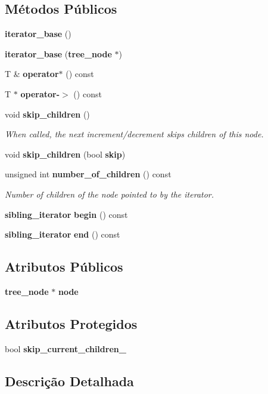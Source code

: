 \subsection*{Métodos Públicos}
\begin{DoxyCompactItemize}
\item 
{\bf iterator\+\_\+base} ()
\item 
{\bf iterator\+\_\+base} ({\bf tree\+\_\+node} $\ast$)
\item 
T \& {\bf operator$\ast$} () const 
\item 
T $\ast$ {\bf operator-\/$>$} () const 
\item 
void {\bf skip\+\_\+children} ()
\begin{DoxyCompactList}\small\item\em When called, the next increment/decrement skips children of this node. \end{DoxyCompactList}\item 
void {\bf skip\+\_\+children} (bool {\bf skip})
\item 
unsigned int {\bf number\+\_\+of\+\_\+children} () const 
\begin{DoxyCompactList}\small\item\em Number of children of the node pointed to by the iterator. \end{DoxyCompactList}\item 
{\bf sibling\+\_\+iterator} {\bf begin} () const 
\item 
{\bf sibling\+\_\+iterator} {\bf end} () const 
\end{DoxyCompactItemize}
\subsection*{Atributos Públicos}
\begin{DoxyCompactItemize}
\item 
{\bf tree\+\_\+node} $\ast$ {\bf node}
\end{DoxyCompactItemize}
\subsection*{Atributos Protegidos}
\begin{DoxyCompactItemize}
\item 
bool {\bf skip\+\_\+current\+\_\+children\+\_\+}
\end{DoxyCompactItemize}


\subsection{Descrição Detalhada}
